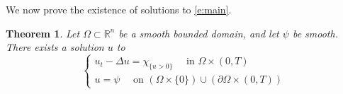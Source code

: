 \documentclass{amsart}
\newtheorem{theorem}{Theorem}[section]
\numberwithin{equation}{section}
\begin{document}




We now prove the existence of solutions to \eqref{e:main}. 
\begin{theorem} \label{t:e}
 Let $\Omega\subset \mathbb{R}^n$ be a smooth bounded domain, and let $\psi$ be smooth. There exists a solution $u$ to 
 \[
 \begin{cases}
  u_t - \Delta u = \chi_{\{u>0\}} \quad \text{ in } \Omega \times (0,T) \\
  u=\psi \quad \text{ on } (\Omega \times \{0\})\cup (\partial \Omega \times (0,T))
 \end{cases}
 \]
\end{theorem}
\end{document}
